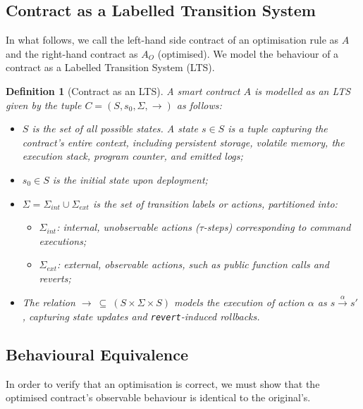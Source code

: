 \documentclass[manuscript,screen,review]{acmart}
\newtheorem{definition}{Definition}
\begin{document}
\subsection{Contract as a Labelled Transition System}

In what follows, we call the left-hand side contract of an optimisation rule as $A$ and the right-hand contract as $A_O$ (optimised). We model the behaviour of a contract as a Labelled Transition System (LTS).

\begin{definition}[Contract as an LTS]
A smart contract $A$ is modelled as an LTS given by the tuple \( C = (S, s_0, \Sigma, \rightarrow) \) as follows:
\begin{itemize}
  \item \(S\) is the set of all possible states. A state \(s \in S\) is a tuple capturing the contract's entire context, including persistent storage, volatile memory, the execution stack, program counter,
  and emitted logs;
  \item \(s_0\in S\) is the initial state upon deployment;
  \item \(\Sigma = \Sigma_{int} \cup \Sigma_{ext}\) is the set of transition labels or actions, partitioned into:
    \begin{itemize}
        \item \(\Sigma_{int}\): internal, unobservable actions ($\tau$-steps) corresponding to command executions;
        \item \(\Sigma_{ext}\): external, observable actions, such as public function calls and reverts;
    \end{itemize}
  \item The relation $\to\ \subseteq\ (S \times \Sigma \times S)$ models the execution of action $\alpha$ as $s \xrightarrow{\alpha} s'$, capturing state updates and \texttt{revert}-induced rollbacks.
\end{itemize}
\end{definition}

\subsection{Behavioural Equivalence}

In order to verify that an optimisation is correct, we must show that the optimised contract's observable behaviour is identical to the original's.
\end{document}
